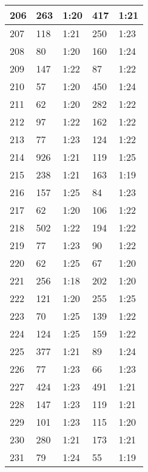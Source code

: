 \begin{center}
\begin{longtable}{|p{2cm}|l|l|l|l|}
206	&   263           &  1:20  &		417     	& 1:21 \\ \hline
207	&   118           &  1:21  &		250     	& 1:23 \\ \hline
208	&   80            &  1:20  &		160     	& 1:24 \\ \hline
209	&   147           &  1:22  &		87      	& 1:22 \\ \hline
210	&   57            &  1:20  &		450     	& 1:24 \\ \hline
211	&   62            &  1:20  &		282     	& 1:22 \\ \hline
212	&   97            &  1:22  &		162     	& 1:22 \\ \hline
213	&   77            &  1:23  &		124     	& 1:22 \\ \hline
214	&   926           &  1:21  &		119     	& 1:25 \\ \hline
215	&   238           &  1:21  &		163     	& 1:19 \\ \hline
216	&   157           &  1:25  &		84      	& 1:23 \\ \hline
217	&   62            &  1:20  &		106     	& 1:22 \\ \hline
218	&   502           &  1:22  &		194     	& 1:22 \\ \hline
219	&   77            &  1:23  &		90          & 1:22 \\ \hline
220	&   62            &  1:25  &		67      	& 1:20 \\ \hline
221	&   256           &  1:18  &		202     	& 1:20 \\ \hline
222	&   121           &  1:20  &		255     	& 1:25 \\ \hline
223	&   70            &  1:25  &		139     	& 1:22 \\ \hline
224	&   124           &  1:25  &		159         & 1:22 \\ \hline
225	&   377           &  1:21  &		89      	& 1:24 \\ \hline
226	&   77            &  1:23  &		66          & 1:23 \\ \hline
227	&   424           &  1:23  &		491     	& 1:21 \\ \hline
228	&   147           &  1:23  &		119     	& 1:21 \\ \hline
229	&   101           &  1:23  &		115     	& 1:20 \\ \hline
230	&   280           &  1:21  &		173     	& 1:21 \\ \hline
231	&   79            &  1:24  &		55      	& 1:19 \\ \hline

\end{longtable}
\end{center}
